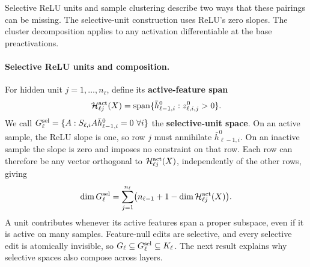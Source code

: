 \documentclass[twoside]{article}
\theoremstyle{remark}
\DeclareMathOperator{\spanop}{span}
\newcommand{\cH}{\mathcal H}
\theoremstyle{highlightdefinition}
\theoremstyle{remark}
\newcommand{\spn}{\spanop}
\begin{document}
Selective ReLU units and sample clustering describe two ways that these pairings can be missing. The selective-unit construction uses ReLU's zero slopes. The cluster decomposition applies to any activation differentiable at the base preactivations.

\paragraph{Selective ReLU units and composition.}
For hidden unit $j=1,\ldots,n_\ell$, define its \textbf{active-feature span}
\[
 \cH_{\ell j}^{\rm act}(X)
 =\spn\{\bar h_{\ell-1,i}^0:z_{\ell,i,j}^0>0\}.
\]
We call $G_\ell^{\rm sel}=\{A:S_{\ell,i}A\bar h_{\ell-1,i}^0=0\ \forall i\}$ the \textbf{selective-unit space}. On an active sample, the ReLU slope is one, so row $j$ must annihilate $\bar h_{\ell-1,i}^0$. On an inactive sample the slope is zero and imposes no constraint on that row. Each row can therefore be any vector orthogonal to $\cH_{\ell j}^{\rm act}(X)$, independently of the other rows, giving
\[
 \dim G_\ell^{\rm sel}
 =\sum_{j=1}^{n_\ell}\bigl(n_{\ell-1}+1-\dim\cH_{\ell j}^{\rm act}(X)\bigr).
\]
A unit contributes whenever its active features span a proper subspace, even if it is active on many samples. Feature-null edits are selective, and every selective edit is atomically invisible, so $G_\ell\subseteq G_\ell^{\rm sel}\subseteq K_\ell$. The next result explains why selective spaces also compose across layers.
\end{document}
